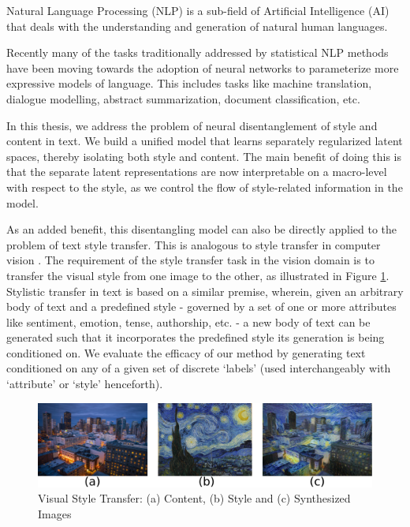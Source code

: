 Natural Language Processing (NLP) is a sub-field of Artificial Intelligence (AI) that deals with the understanding and generation of natural human languages.

Recently many of the tasks traditionally addressed by statistical NLP methods have been moving towards the adoption of neural networks to parameterize more expressive models of language. This includes tasks like machine translation, dialogue modelling, abstract summarization, document classification, etc.

In this thesis, we address the problem of neural disentanglement of style and content in text. We build a unified model that learns separately regularized latent spaces, thereby isolating both style and content. The main benefit of doing this is that the separate latent representations are now interpretable on a macro-level with respect to the style, as we control the flow of style-related information in the model.

As an added benefit, this disentangling model can also be directly applied to the problem of text style transfer. This is analogous to style transfer in computer vision \citep{gatys2016image}. The requirement of the style transfer task in the vision domain is to transfer the visual style from one image to the other, as illustrated in Figure \ref{fig:style-transfer-vision}. Stylistic transfer in text is based on a similar premise, wherein, given an arbitrary body of text and a predefined style - governed by a set of one or more attributes like sentiment, emotion, tense, authorship, etc. - a new body of text can be generated such that it incorporates the predefined style its generation is being conditioned on. We evaluate the efficacy of our method by generating text conditioned on any of a given set of discrete `labels' (used interchangeably with `attribute' or `style' henceforth).

\begin{figure}[ht]
	\centering
	\includegraphics[width=\textwidth]{images/style-transfer-vision}
	\caption{\label{fig:style-transfer-vision}Visual Style Transfer: (a) Content, (b) Style and (c) Synthesized Images}
\end{figure}


